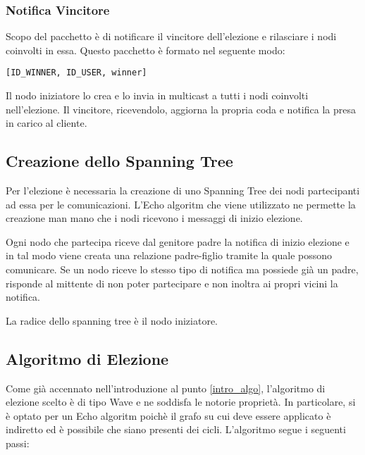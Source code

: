\subsubsection{Notifica Vincitore}\label{pacchetto_vincitore}
Scopo del pacchetto è di notificare il vincitore dell'elezione e rilasciare i nodi coinvolti in essa. Questo pacchetto è formato nel seguente modo:

\begin{lstlisting}
[ID_WINNER, ID_USER, winner]
\end{lstlisting}

Il nodo iniziatore lo crea e lo invia in multicast a tutti i nodi coinvolti nell'elezione. Il vincitore, ricevendolo, aggiorna la propria coda e notifica la presa in carico al cliente.

\subsection{Creazione dello Spanning Tree}

Per l'elezione è necessaria la creazione di uno Spanning Tree dei nodi partecipanti ad essa per le comunicazioni. L'Echo algoritm che viene utilizzato ne permette la creazione man mano che i nodi ricevono i messaggi di inizio elezione.

Ogni nodo che partecipa riceve dal genitore padre la notifica di inizio elezione e in tal modo viene creata una relazione padre-figlio tramite la quale possono comunicare. Se un nodo riceve lo stesso tipo di notifica ma possiede già un padre, risponde al mittente di non poter partecipare e non inoltra ai propri vicini la notifica.

La radice dello spanning tree è il nodo iniziatore.

\subsection{Algoritmo di Elezione}

Come già accennato nell'introduzione al punto \ref{intro_algo}, l'algoritmo di elezione scelto è di tipo Wave e ne soddisfa le notorie proprietà. In particolare, si è optato per un Echo algoritm poichè il grafo su cui deve essere applicato è indiretto ed è possibile che siano presenti dei cicli.
L'algoritmo segue i seguenti passi:

